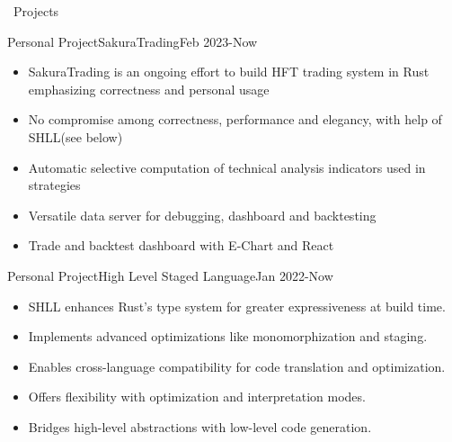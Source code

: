 \documentclass{resume}
\begin{document}
\begin{rSection}{\faUsers~Projects}
    \begin{rProject}{Personal Project}{SakuraTrading}{Feb 2023-Now}
        \begin{itemize}
            \itemsep -0.5em \vspace{-0.5em}
            \item SakuraTrading is an ongoing effort to build HFT trading system in Rust emphasizing correctness and personal usage
            \item No compromise among correctness, performance and elegancy, with help of SHLL(see below)
            \item Automatic selective computation of technical analysis indicators used in strategies
            \item Versatile data server for debugging, dashboard and backtesting
            \item Trade and backtest dashboard with E-Chart and React
        \end{itemize}
    \end{rProject}
    \begin{rProject}{Personal Project}{High Level Staged Language}{Jan 2022-Now}
        \begin{itemize}
            \itemsep -0.5em \vspace{-0.5em}
            \item SHLL enhances Rust's type system for greater expressiveness at build time.
            \item Implements advanced optimizations like monomorphization and staging.
            \item Enables cross-language compatibility for code translation and optimization.
            \item Offers flexibility with optimization and interpretation modes.
            \item Bridges high-level abstractions with low-level code generation.
        \end{itemize}
    \end{rProject}
\end{rSection}
\end{document}
